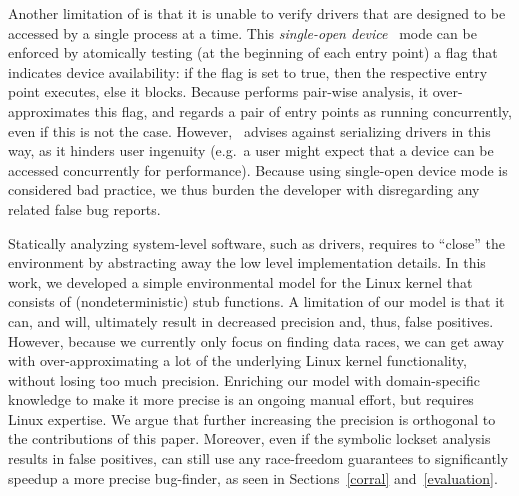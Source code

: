 
Another limitation of \whoop is that it is unable to verify drivers that are designed to be accessed by a single process at a time. This \emph{single-open device}~\cite{corbet2005linux} mode can be enforced by atomically testing (at the beginning of each entry point) a flag that indicates device availability: if the flag is set to true, then the respective entry point executes, else it blocks. Because \whoop performs pair-wise analysis, it over-approximates this flag, and regards a pair of entry points as running concurrently, even if this is not the case. However,~\cite{corbet2005linux} advises against serializing drivers in this way, as it hinders user ingenuity (e.g.\ a user might expect that a device can be accessed concurrently for performance). Because using single-open device mode is considered bad practice, we thus burden the developer with disregarding any related false bug reports.

Statically analyzing system-level software, such as drivers, requires to ``close'' the environment by abstracting away the low level implementation details. In this work, we developed a simple environmental model for the Linux kernel that consists of (nondeterministic) stub functions. A limitation of our model is that it can, and will, ultimately result in decreased precision and, thus, false positives. However, because we currently only focus on finding data races, we can get away with over-approximating a lot of the underlying Linux kernel functionality, without losing too much precision. Enriching our model with domain-specific knowledge to make it more precise is an ongoing manual effort, but requires Linux expertise. We argue that further increasing the precision is orthogonal to the contributions of this paper. Moreover, even if the symbolic lockset analysis results in false positives, \whoop can still use any race-freedom guarantees to significantly speedup a more precise bug-finder, as seen in Sections~\ref{corral} and~\ref{evaluation}.
